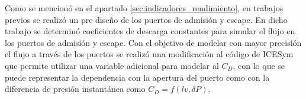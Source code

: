Como se mencionó en el apartado \ref{sec:indicadores_rendimiento}, en trabajos
previos se realizó un pre diseño de los puertos de admisión y escape.
%
En dicho trabajo se determinó coeficientes de descarga constantes
para simular el flujo en los puertos de admisión y escape.
%
Con el objetivo de modelar con mayor precisión el flujo a través de los puertos
se realizó una modificación al código de ICESym que permite utilizar una
variable adicional para modelar al $C_D$, con lo que se puede representar la
dependencia con la apertura del puerto como con la diferencia de presión
instantánea como $C_D = f(lv, \delta P)$.
